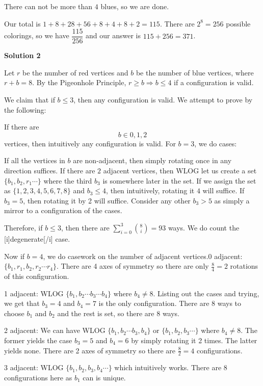 \begin{enumerate}
 There can not be more than $4$ blues, so we are done. 

 Our total is $1+8+28+56+8+4+8+2=115$. There are $2^8=256$ possible colorings, so we have $\dfrac{115}{256}$ and our answer is $115+256=\boxed{371}$.

 



\textbf{Solution 2}

Let $r$ be the number of red vertices and $b$ be the number of blue vertices, where $r+b=8$. By the Pigeonhole Principle, $r\geq{b} \Longrightarrow b\leq4$ if a configuration is valid.

 We claim that if $b\leq3$, then any configuration is valid. We attempt to prove by the following:

 If there are 
 \[b\in{0,1,2}\] vertices, then intuitively any configuration is valid. For $b=3$, we do cases:

 If all the vertices in $b$ are non-adjacent, then simply rotating once in any direction suffices. If there are $2$ adjacent vertices, then WLOG let us create a set $\{b_1,b_2,r_1\cdots\}$ where the third $b_3$ is somewhere later in the set. If we assign the set as $\{1,2,3,4,5,6,7,8\}$ and $b_3\leq4$, then intuitively, rotating it $4$ will suffice. If $b_3=5$, then rotating it by 2 will suffice. Consider any other $b_3>5$ as simply a mirror to a configuration of the cases.

 Therefore, if $b\leq3$, then there are $\sum_{i=0}^{3}{\binom{8}{i}}=93$ ways. We do count the [i]degenerate[/i] case.

 Now if $b=4$, we do casework on the number of adjacent vertices.0 adjacent: $\{b_1,r_1,b_2,r_2\cdots{r_4}\}$. There are 4 axes of symmetry so there are only $\frac{8}{4}=2$ rotations of this configuration.

 1 adjacent: WLOG $\{b_1,b_2\cdots{b_3}\cdots{b_4}\}$ where $b_4\neq{8}$. Listing out the cases and trying, we get that $b_3=4$ and $b_4=7$ is the only configuration. There are $8$ ways to choose $b_1$ and $b_2$ and the rest is set, so there are $8$ ways.

 2 adjacent: We can have WLOG $\{b_1,b_2\cdots{b_3},b_4\}$ or $\{b_1,b_2,b_3\cdots\}$ where $b_4\neq{8}$. The former yields the case $b_3=5$ and $b_4=6$ by simply rotating it 2 times. The latter yields none. There are 2 axes of symmetry so there are $\frac{8}{2}=4$ configurations.

 3 adjacent: WLOG $\{b_1,b_2,b_3,b_4\cdots\}$ which intuitively works. There are $8$ configurations here as $b_1$ can is unique.


\end{enumerate}
